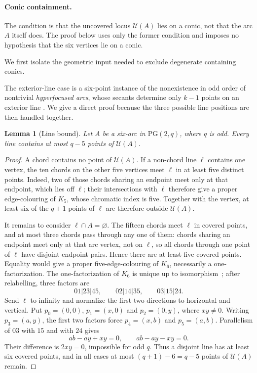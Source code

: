 \documentclass[11pt]{article}
\newtheorem{lemma}[theorem]{Lemma}
\theoremstyle{definition}
\theoremstyle{remark}
\newcommand{\PG}{\mathrm{PG}}
\newcommand{\cU}{\mathcal{U}}
\begin{document}
\paragraph{Conic containment.}
The condition is that the uncovered locus $\cU(A)$ lies on a conic, not
that the arc $A$ itself does.  The proof below uses only the former
condition and imposes no hypothesis that the six vertices lie on a conic.

We first isolate the geometric input needed to exclude degenerate
containing conics.

The exterior-line case is a six-point instance of the nonexistence in odd
order of nontrivial \emph{hyperfocused arcs}, whose secants determine only
$k-1$ points on an exterior line
\cite{BicharaKorchmaros1982,DrakeKeating2004,NgWild2001}. We give a direct
proof because the three possible line positions are then handled together.

\begin{lemma}[Line bound]
\label{lem:six-arc-line-bound}
Let $A$ be a six-arc in $\PG(2,q)$, where $q$ is odd. Every line contains at
most $q-5$ points of $\cU(A)$.
\end{lemma}

\begin{proof}
A chord contains no point of $\cU(A)$. If a non-chord line $\ell$ contains
one vertex, the ten chords on the other five vertices meet $\ell$ in at
least five distinct points. Indeed, two of those chords sharing an endpoint
meet only at that endpoint, which lies off $\ell$; their intersections with
$\ell$ therefore give a proper edge-colouring of $K_5$, whose chromatic
index is five. Together with the vertex, at least six of the $q+1$ points
of $\ell$ are therefore outside $\cU(A)$.

It remains to consider $\ell\cap A=\varnothing$. The fifteen chords meet
$\ell$ in covered points, and at most three chords pass through any one of
them: chords sharing an endpoint meet only at that arc vertex, not on
$\ell$, so all chords through one point of $\ell$ have disjoint endpoint
pairs. Hence there are at least five covered points. Equality would give a
proper five-edge-colouring of
$K_6$, necessarily a one-factorization. The one-factorization of $K_6$ is
unique up to isomorphism~\cite{MendelsohnRosa1985}; after relabelling,
three factors are
\[
  01|23|45,\qquad 02|14|35,\qquad 03|15|24.
\]
Send $\ell$ to infinity and normalize the first two directions to horizontal
and vertical. Put $p_0=(0,0)$, $p_1=(x,0)$ and $p_2=(0,y)$, where
$xy\ne0$. Writing $p_3=(a,y)$, the first two factors force
$p_4=(x,b)$ and $p_5=(a,b)$. Parallelism of $03$ with $15$ and with $24$
gives
\[
 ab-ay+xy=0,\qquad ab-ay-xy=0.
\]
Their difference is $2xy=0$, impossible for odd $q$. Thus a disjoint line
has at least six covered points, and in all cases at most
$(q+1)-6=q-5$ points of $\cU(A)$ remain.
\end{proof}
\end{document}
